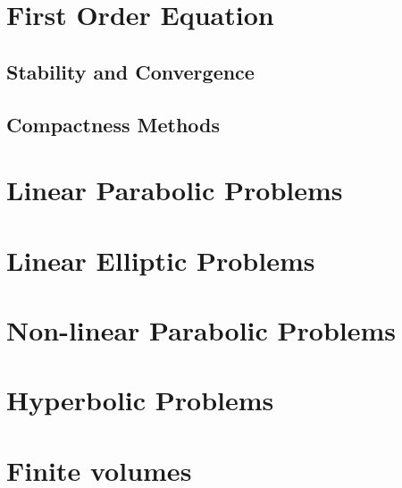 \chapter{First Order Equation}

\section{Stability and Convergence}

\section{Compactness Methods}

\chapter{Linear Parabolic Problems}

\chapter{Linear Elliptic Problems}

\chapter{Non-linear Parabolic Problems}

\chapter{Hyperbolic Problems}

\chapter{Finite volumes}